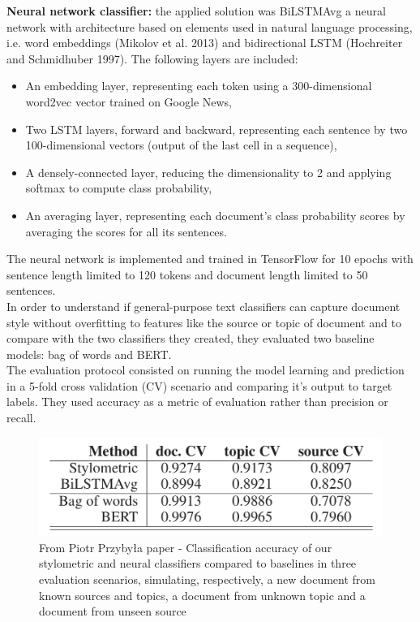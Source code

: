\documentclass[10pt, english]{report}
\begin{document}
\textbf{Neural network classifier:} the applied solution was BiLSTMAvg a neural network with architecture based on elements used in natural language processing, i.e. word embeddings (Mikolov et al. 2013) and bidirectional LSTM (Hochreiter and Schmidhuber 1997). The following layers are included:
	\begin{itemize}
	\item An embedding layer, representing each token using a 300-dimensional word2vec vector trained on Google News,
	\item Two LSTM layers, forward and backward, representing each sentence by two 100-dimensional vectors (output of the last cell in a sequence),
	\item A densely-connected layer, reducing the dimensionality to 2 and applying softmax to compute class probability,
	\item An averaging layer, representing each document’s class probability scores by averaging the scores for all its sentences.
	\end{itemize}
The neural network is implemented and trained in TensorFlow for 10 epochs with sentence length limited to 120 tokens and document length limited to 50 sentences.\\

In order to understand if general-purpose text classifiers can capture document style without overfitting to features like the source or topic of document and to compare with the two classifiers they created, they evaluated two baseline models: bag of words and BERT.\\

The evaluation protocol consisted on running the model learning and prediction in a 5-fold cross validation (CV) scenario and comparing it's output to target labels. They used accuracy as a metric of evaluation rather than precision or recall.

\begin{figure}[H]
	\centering
	\includegraphics[scale=0.3]{img/styled_model_result.png}
	\caption{From Piotr Przybyła paper - Classiﬁcation accuracy of our stylometric and neural classiﬁers compared to baselines in three evaluation scenarios, simulating, respectively, a new document from known sources and topics, a document from unknown topic and a document from unseen source}
\end{figure}
\end{document}
